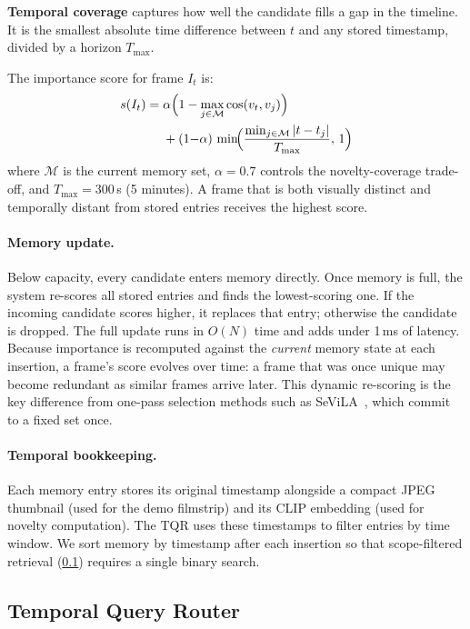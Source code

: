 \textbf{Temporal coverage} captures how well the candidate fills a gap in the timeline. It is the smallest absolute time difference between $t$ and any stored timestamp, divided by a horizon $T_{\max}$.

The importance score for frame $I_t$ is:
\begin{equation}
\begin{split}
  s(I_t) =\; & \alpha \Bigl(1 - \max_{j \in \mathcal{M}} \cos(v_t, v_j)\Bigr) \\
  & + (1{-}\alpha)\,\min\!\Bigl(\frac{\min_{j \in \mathcal{M}} |t - t_j|}{T_{\max}},\, 1\Bigr)
\end{split}
  \label{eq:importance}
\end{equation}
where $\mathcal{M}$ is the current memory set, $\alpha = 0.7$ controls the novelty-coverage trade-off, and $T_{\max} = 300$\,s (5 minutes). A frame that is both visually distinct and temporally distant from stored entries receives the highest score.

\paragraph{Memory update.}
Below capacity, every candidate enters memory directly.
Once memory is full, the system re-scores all stored entries and finds the lowest-scoring one. If the incoming candidate scores higher, it replaces that entry; otherwise the candidate is dropped. The full update runs in $O(N)$ time and adds under 1\,ms of latency.
Because importance is recomputed against the \emph{current} memory state at each insertion, a frame's score evolves over time: a frame that was once unique may become redundant as similar frames arrive later.
This dynamic re-scoring is the key difference from one-pass selection methods such as SeViLA~\cite{yu2023sevila}, which commit to a fixed set once.

\paragraph{Temporal bookkeeping.}
Each memory entry stores its original timestamp alongside a compact JPEG thumbnail (used for the demo filmstrip) and its CLIP embedding (used for novelty computation). The TQR uses these timestamps to filter entries by time window. We sort memory by timestamp after each insertion so that scope-filtered retrieval (\cref{sec:tqr}) requires a single binary search.


\subsection{Temporal Query Router}
\label{sec:tqr}

